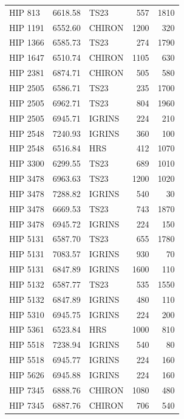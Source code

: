 {\begin{scriptsize}
\begin{longtable}{|l|rlrr|}
     HIP 813 &  6618.58 &       TS23 &      557 &  1810 \\
    HIP 1191 &  6552.60 &     CHIRON &     1200 &   320 \\
    HIP 1366 &  6585.73 &       TS23 &      274 &  1790 \\
    HIP 1647 &  6510.74 &     CHIRON &     1105 &   630 \\
    HIP 2381 &  6874.71 &     CHIRON &      505 &   580 \\
    HIP 2505 &  6586.71 &       TS23 &      235 &  1700 \\
    HIP 2505 &  6962.71 &       TS23 &      804 &  1960 \\
    HIP 2505 &  6945.71 &     IGRINS &      224 &   210 \\
    HIP 2548 &  7240.93 &     IGRINS &      360 &   100 \\
    HIP 2548 &  6516.84 &        HRS &      412 &  1070 \\
    HIP 3300 &  6299.55 &       TS23 &      689 &  1010 \\
    HIP 3478 &  6963.63 &       TS23 &     1200 &  1020 \\
    HIP 3478 &  7288.82 &     IGRINS &      540 &    30 \\
    HIP 3478 &  6669.53 &       TS23 &      743 &  1870 \\
    HIP 3478 &  6945.72 &     IGRINS &      224 &   150 \\
    HIP 5131 &  6587.70 &       TS23 &      655 &  1780 \\
    HIP 5131 &  7083.57 &     IGRINS &      930 &    70 \\
    HIP 5131 &  6847.89 &     IGRINS &     1600 &   110 \\
    HIP 5132 &  6587.77 &       TS23 &      535 &  1550 \\
    HIP 5132 &  6847.89 &     IGRINS &      480 &   110 \\
    HIP 5310 &  6945.75 &     IGRINS &      224 &   200 \\
    HIP 5361 &  6523.84 &        HRS &     1000 &   810 \\
    HIP 5518 &  7238.94 &     IGRINS &      540 &    80 \\
    HIP 5518 &  6945.77 &     IGRINS &      224 &   160 \\
    HIP 5626 &  6945.88 &     IGRINS &      224 &   160 \\
    HIP 7345 &  6888.76 &     CHIRON &     1080 &   480 \\
    HIP 7345 &  6887.76 &     CHIRON &      706 &   540 \\

\end{longtable}
\end{scriptsize}}
